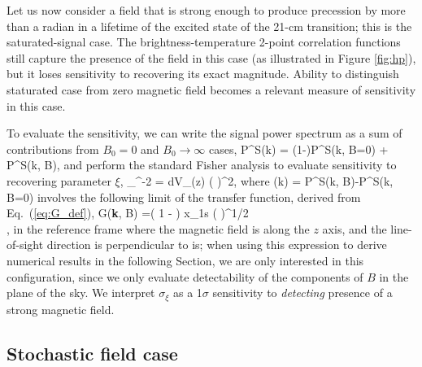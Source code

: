 Let us now consider a field that is strong enough to produce precession by more than a radian in a lifetime of the excited state of the 21-cm transition; this is the saturated-signal case. The brightness-temperature 2-point correlation functions still capture the presence of the field in this case (as illustrated in Figure \ref{fig:hp}), but it loses sensitivity to recovering its exact magnitude. Ability to distinguish staturated case from zero magnetic field becomes a relevant measure of sensitivity in this case. 

To evaluate the sensitivity, we can write the signal power spectrum as a sum of contributions from $B_0=0$ and $B_0\to\infty$ cases, 
\beq
P^S(\vec k) = (1-\xi)P^S(\vec k, B=0) + \xi P^S(\vec k, B\to \infty),
\label{eq:saturated_P}
\eeq
and perform the standard Fisher analysis to evaluate sensitivity to recovering parameter $\xi$,
\beq
\bga
\sigma_{\xi}^{-2} = 
\int dV_\mathrm{}(z)
\left(  \right)^2,
\ega
\label{eq:sigma_xi}
\eeq
where
\beq
{}(\vec k) = P^S(\vec k, B\to \infty)-P^S(\vec k, B=0)
\eeq
involves the following limit of the transfer function, derived from Eq.~(\ref{eq:G_def}),
\beq
\bga
G({\bf{\widehat k}}, B\to \infty)
=\left( 1 -  \right) x_{1{\rm s}} \left(  \right)^{1/2} \\
\times {} ,
\label{eq:G_Binf}
\ega
\eeq
in the reference frame where the magnetic field is along the $z$ axis, and the line-of-sight direction is perpendicular to is; when using this expression to derive numerical results in the following Section, we are only interested in this configuration, since we only evaluate detectability of the components of $B$ in the plane of the sky. We interpret $\sigma_\xi$ as a 1$\sigma$ sensitivity to \textit{detecting} presence of a strong magnetic field. 

\subsection{Stochastic field case}
\label{subsec:stochastic_fisher}


